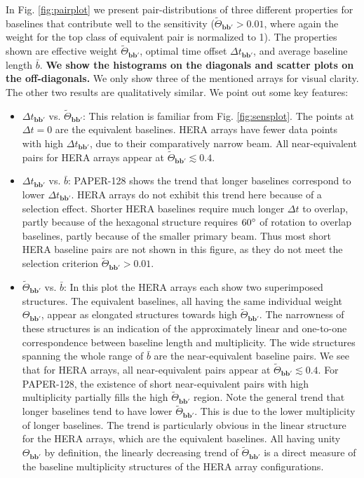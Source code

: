 \documentclass[twocolumn,apj,numberedappendix]{emulateapj}
\renewcommand\[{\begin{equation}}
\renewcommand\]{\end{equation}}
\begin{document}
In Fig. \ref{fig:pairplot} we present pair-distributions of three different properties for baselines that contribute well to the sensitivity ($\widetilde{\Theta}_{\boldsymbol{bb'}}>0.01$, where again the weight for the top class of equivalent pair is normalized to 1). The properties shown are effective weight $\widetilde{\Theta}_{\boldsymbol{bb'}}$, optimal time offset $\Delta t_{\boldsymbol{bb'}}$, and average baseline length $\bar{b}$. \textbf{We show the histograms on the diagonals and scatter plots on the off-diagonals.} We only show three of the mentioned arrays for visual clarity. The other two results are qualitatively similar. We point out some key features:
\begin{itemize}

\item $\Delta t_{\boldsymbol{bb'}}$ vs. $\widetilde{\Theta}_{\boldsymbol{bb'}}$:
This relation  is familiar from Fig. \ref{fig:sensplot}. The points at $\Delta t=0$ are the equivalent baselines. HERA arrays have fewer data points with high $\Delta t_{\boldsymbol{bb'}}$, due to their comparatively narrow beam. All near-equivalent pairs for HERA arrays appear at $\widetilde{\Theta}_{\boldsymbol{bb'}}\lesssim 0.4$.

\item $\Delta t_{\boldsymbol{bb'}}$ vs. $\bar{b}$:
PAPER-128 shows the trend that longer baselines correspond to lower $\Delta t_{\boldsymbol{bb'}}$. HERA arrays do not exhibit this trend here because of a selection effect. Shorter HERA baselines require much longer $\Delta t$ to overlap, partly because of the hexagonal structure requires $60\degree$ of rotation to overlap baselines, partly because of the smaller primary beam. Thus most short HERA baseline pairs are not shown in this figure, as they do not meet the selection criterion $\widetilde{\Theta}_{\boldsymbol{bb'}}>0.01$.


\item $\widetilde{\Theta}_{\boldsymbol{bb'}}$ vs. $\bar{b}$:
In this plot the HERA arrays each show two superimposed structures.  The equivalent baselines, all having the same individual weight $\Theta_{\boldsymbol{bb'}}$, appear as elongated structures towards high $\widetilde{\Theta}_{\boldsymbol{bb'}}$. The narrowness of these structures is an indication of the approximately linear and one-to-one correspondence between baseline length and multiplicity. The wide structures spanning the whole range of $\bar{b}$ are the near-equivalent baseline pairs. We see that for HERA arrays, all near-equivalent pairs appear at $\widetilde{\Theta}_{\boldsymbol{bb'}}\lesssim 0.4$. For PAPER-128, the existence of short near-equivalent pairs with high multiplicity partially fills the high $\widetilde{\Theta}_{\boldsymbol{bb'}}$ region. 
Note the general trend that longer baselines tend to have lower $\widetilde{\Theta}_{\boldsymbol{bb'}}$. This is due to the lower multiplicity of longer baselines. The trend is particularly obvious in the linear structure for the HERA arrays, which are the equivalent baselines. All having unity $\Theta_{\boldsymbol{bb'}}$ by definition, the linearly decreasing trend of $\widetilde{\Theta}_{\boldsymbol{bb'}}$ is a direct measure of the baseline multiplicity structures of the HERA array configurations.


\end{itemize}
\end{document}
